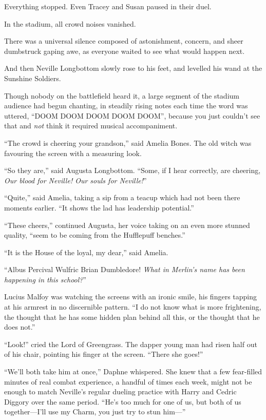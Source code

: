 Everything stopped. Even Tracey and Susan paused in their duel.

In the stadium, all crowd noises vanished.

There was a universal silence composed of astonishment, concern, and sheer dumbstruck gaping awe, as everyone waited to see what would happen next.

And then Neville Longbottom slowly rose to his feet, and levelled his wand at the Sunshine Soldiers.

Though nobody on the battlefield heard it, a large segment of the stadium audience had begun chanting, in steadily rising notes each time the word was uttered, “DOOM DOOM DOOM DOOM DOOM”, because you just couldn’t see that and \emph{not} think it required musical accompaniment.

“The crowd is cheering your grandson,” said Amelia Bones. The old witch was favouring the screen with a measuring look.

“So they are,” said Augusta Longbottom. “Some, if I hear correctly, are cheering, \emph{Our blood for Neville! Our souls for Neville!}”

“Quite,” said Amelia, taking a sip from a teacup which had not been there moments earlier. “It shows the lad has leadership potential.”

“These cheers,” continued Augusta, her voice taking on an even more stunned quality, “seem to be coming from the Hufflepuff benches.”

“It is the House of the loyal, my dear,” said Amelia.

“Albus Percival Wulfric Brian Dumbledore! \emph{What in Merlin’s name has been happening in this school?}”

Lucius Malfoy was watching the screens with an ironic smile, his fingers tapping at his armrest in no discernible pattern. “I do not know what is more frightening, the thought that he has some hidden plan behind all this, or the thought that he does not.”

“Look!” cried the Lord of Greengrass. The dapper young man had risen half out of his chair, pointing his finger at the screen. “There she goes!”

\later

“We’ll both take him at once,” Daphne whispered. She knew that a few fear-filled minutes of real combat experience, a handful of times each week, might not be enough to match Neville’s regular dueling practice with Harry and Cedric Diggory over the same period. “He’s too much for one of us, but both of us together—I’ll use my Charm, you just try to stun him—”

